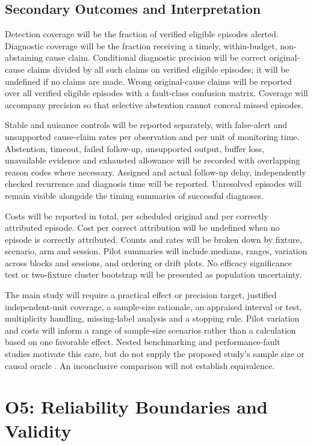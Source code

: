 \subsection{Secondary Outcomes and Interpretation}

Detection coverage will be the fraction of verified eligible episodes alerted. Diagnostic coverage will be the fraction receiving a timely, within-budget, non-abstaining cause claim. Conditional diagnostic precision will be correct original-cause claims divided by all such claims on verified eligible episodes; it will be undefined if no claims are made. Wrong original-cause claims will be reported over all verified eligible episodes with a fault-class confusion matrix. Coverage will accompany precision so that selective abstention cannot conceal missed episodes.

Stable and nuisance controls will be reported separately, with false-alert and unsupported cause-claim rates per observation and per unit of monitoring time. Abstention, timeout, failed follow-up, unsupported output, buffer loss, unavailable evidence and exhausted allowance will be recorded with overlapping reason codes where necessary. Assigned and actual follow-up delay, independently checked recurrence and diagnosis time will be reported. Unresolved episodes will remain visible alongside the timing summaries of successful diagnoses.

Costs will be reported in total, per scheduled original and per correctly attributed episode. Cost per correct attribution will be undefined when no episode is correctly attributed. Counts and rates will be broken down by fixture, scenario, arm and session. Pilot summaries will include medians, ranges, variation across blocks and sessions, and ordering or drift plots. No efficacy significance test or two-fixture cluster bootstrap will be presented as population uncertainty.

The main study will require a practical effect or precision target, justified independent-unit coverage, a sample-size rationale, an appraised interval or test, multiplicity handling, missing-label analysis and a stopping rule. Pilot variation and costs will inform a range of sample-size scenarios rather than a calculation based on one favorable effect. Nested benchmarking and performance-fault studies motivate this care, but do not supply the proposed study's sample size or causal oracle \parencite{GJMALCNF,E8MGSAC8,WF5NM72E}. An inconclusive comparison will not establish equivalence.

\section{O5: Reliability Boundaries and Validity}
\label{sec:o5-validity}

